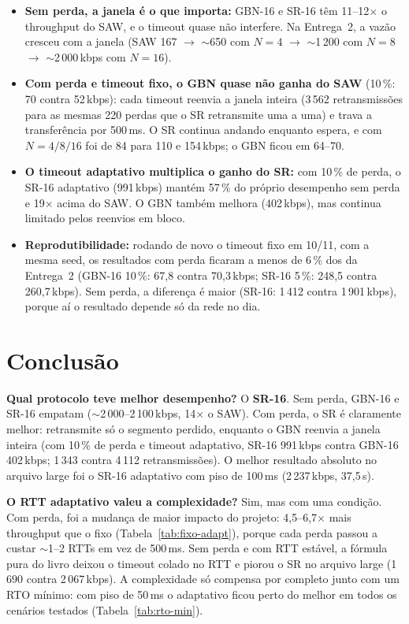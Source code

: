 \documentclass[11pt,a4paper]{article}
\begin{document}
\begin{itemize}
  \item \textbf{Sem perda, a janela é o que importa:} GBN-16 e SR-16 têm 11--12$\times$ o throughput
        do SAW, e o timeout quase não interfere. Na Entrega~2, a vazão cresceu com a janela
        (SAW 167 $\rightarrow$ $\sim$650 com $N=4$ $\rightarrow$ $\sim$1\,200 com $N=8$ $\rightarrow$
        $\sim$2\,000\,kbps com $N=16$).
  \item \textbf{Com perda e timeout fixo, o GBN quase não ganha do SAW} (10\,\%: 70 contra 52\,kbps):
        cada timeout reenvia a janela inteira (3\,562 retransmissões para as mesmas 220 perdas que o
        SR retransmite uma a uma) e trava a transferência por 500\,ms. O SR continua andando
        enquanto espera, e com $N=4/8/16$ foi de 84 para 110 e 154\,kbps; o GBN ficou em 64--70.
  \item \textbf{O timeout adaptativo multiplica o ganho do SR:} com 10\,\% de perda, o SR-16
        adaptativo (991\,kbps) mantém 57\,\% do próprio desempenho sem perda e 19$\times$ acima do
        SAW. O GBN também melhora (402\,kbps), mas continua limitado pelos reenvios em bloco.
  \item \textbf{Reprodutibilidade:} rodando de novo o timeout fixo em 10/11, com a mesma seed, os
        resultados com perda ficaram a menos de 6\,\% dos da Entrega~2 (GBN-16 10\,\%: 67,8 contra
        70,3\,kbps; SR-16 5\,\%: 248,5 contra 260,7\,kbps). Sem perda, a diferença é maior (SR-16:
        1\,412 contra 1\,901\,kbps), porque aí o resultado depende só da rede no dia.
\end{itemize}

\section{Conclusão}

\textbf{Qual protocolo teve melhor desempenho?} O \textbf{SR-16}. Sem perda, GBN-16 e SR-16 empatam
($\sim$2\,000--2\,100\,kbps, 14$\times$ o SAW). Com perda, o SR é claramente melhor: retransmite só o
segmento perdido, enquanto o GBN reenvia a janela inteira (com 10\,\% de perda e timeout adaptativo,
SR-16 991\,kbps contra GBN-16 402\,kbps; 1\,343 contra 4\,112 retransmissões). O melhor resultado
absoluto no arquivo large foi o SR-16 adaptativo com piso de 100\,ms (2\,237\,kbps, 37,5\,s).

\textbf{O RTT adaptativo valeu a complexidade?} Sim, mas com uma condição. Com perda, foi a mudança
de maior impacto do projeto: 4,5--6,7$\times$ mais throughput que o fixo (Tabela~\ref{tab:fixo-adapt}),
porque cada perda passou a custar $\sim$1--2 RTTs em vez de 500\,ms. Sem perda e com RTT estável,
a fórmula pura do livro deixou o timeout colado no RTT e piorou o SR no arquivo large (1\,690 contra
2\,067\,kbps). A complexidade só compensa por completo junto com um RTO mínimo: com piso de 50\,ms o
adaptativo ficou perto do melhor em todos os cenários testados (Tabela~\ref{tab:rto-min}).
\end{document}
